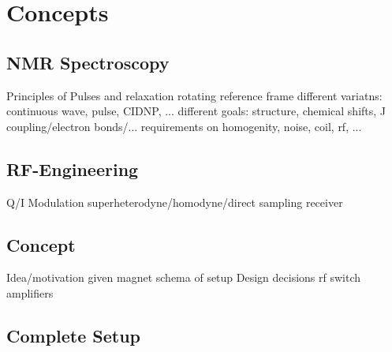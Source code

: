 \chapter{Concepts}


\section{NMR Spectroscopy}
Principles of Pulses and relaxation
rotating reference frame
different variatns: continuous wave, pulse, CIDNP, ...
different goals: structure, chemical shifts, J coupling/electron bonds/...
requirements on homogenity, noise, coil, rf, ...




\section{RF-Engineering}
Q/I Modulation
superheterodyne/homodyne/direct sampling receiver


\section{Concept}
Idea/motivation
given magnet
schema of setup
Design decisions
rf switch
amplifiers

\section{Complete Setup}


